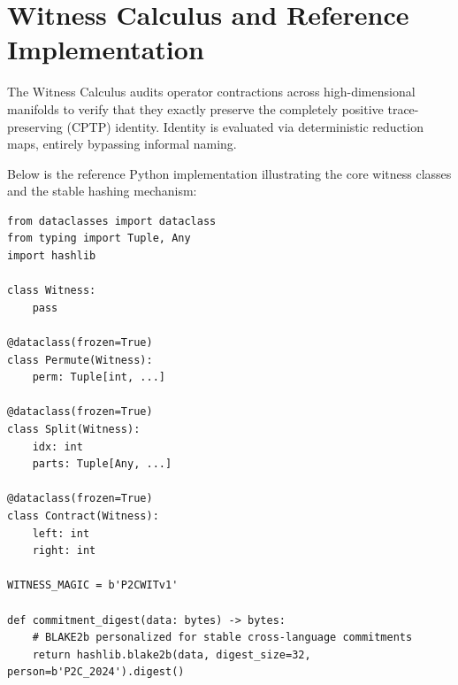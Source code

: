 \documentclass[11pt]{article}
\begin{document}
\section{Witness Calculus and Reference Implementation}
The Witness Calculus audits operator contractions across high-dimensional manifolds to verify that they exactly preserve the completely positive trace-preserving (CPTP) identity. Identity is evaluated via deterministic reduction maps, entirely bypassing informal naming.

Below is the reference Python implementation illustrating the core witness classes and the stable hashing mechanism:

\begin{lstlisting}
from dataclasses import dataclass
from typing import Tuple, Any
import hashlib

class Witness:
    pass

@dataclass(frozen=True)
class Permute(Witness):
    perm: Tuple[int, ...]

@dataclass(frozen=True)
class Split(Witness):
    idx: int
    parts: Tuple[Any, ...]

@dataclass(frozen=True)
class Contract(Witness):
    left: int
    right: int

WITNESS_MAGIC = b'P2CWITv1'

def commitment_digest(data: bytes) -> bytes:
    # BLAKE2b personalized for stable cross-language commitments
    return hashlib.blake2b(data, digest_size=32, person=b'P2C_2024').digest()
\end{lstlisting}
\end{document}
